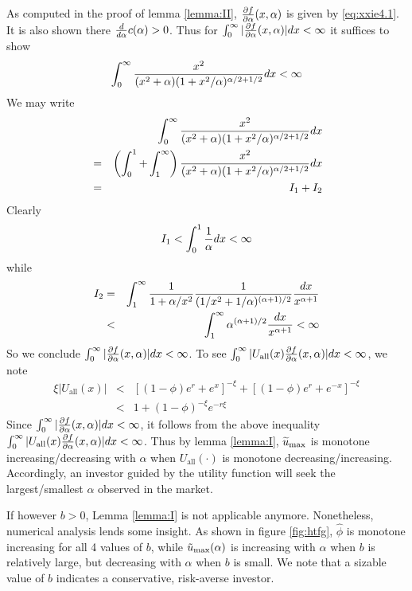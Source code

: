 \documentclass[11pt,a4]{amsart}
\newcommand{\pd}{\partial}
\newcommand{\wt}{\widetilde}
\newcommand{\1}{{\mathbf 1}}
\begin{document}
As computed in the proof of lemma \ref{lemma:II}, ${\pd f \over \pd
  \alpha}(x, \alpha)$ is given by \eqref{eq:xxie4.1}. It is also shown
there ${d \over d \alpha} c(\alpha) > 0$. Thus for
$\int_0^\infty |{\pd f \over \pd \alpha}(x, \alpha)| dx < \infty$
it suffices to show
\[
\int_ 0^\infty {
x^2
\over
(x^2 + \alpha) (1 + x^2 / \alpha)^{\alpha/2 + 1/2}
} dx < \infty
\]
We may write
\begin{eqnarray*}
&& \int_ 0^\infty {
x^2
\over
(x^2 + \alpha) (1 + x^2 / \alpha)^{\alpha/2 + 1/2}
} dx \\
&=& \left(\int_0^1 + \int_1^\infty \right) {
x^2
\over
(x^2 + \alpha) (1 + x^2 / \alpha)^{\alpha/2 + 1/2}
} dx \\
&=& I_1 + I_2
\end{eqnarray*}
Clearly
\[
I_1 < \int_0^1 {1 \over \alpha} dx < \infty
\]
while
\begin{eqnarray*}
  I_2 &=& \int_1^\infty {1 \over 1 + \alpha/x^2}
  {1 \over (1/x^2 + 1/\alpha)^{(\alpha+1) / 2}} {dx \over x^{\alpha +
      1}} \\
  &<& \int_1^\infty \alpha^{(\alpha+1) / 2} {dx \over x^{\alpha + 1}}
  < \infty
\end{eqnarray*}
So we conclude
$\int_0^\infty |{\pd f \over \pd \alpha}(x, \alpha)| dx < \infty$.
To see
$\int_0^\infty |U_{\text{all}}(x){\pd f \over \pd \alpha}(x, \alpha)| dx < \infty$, we note
\begin{eqnarray*}
  \xi |U_{\text{all}}(x)|
  &<& [(1 - \phi) e^r + e^x]^{-\xi} + [(1 - \phi) e^r + e^{-x}]^{-\xi} \\
  &<& 1 + (1 - \phi)^{-\xi} e^{-r \xi}
\end{eqnarray*}
Since $\int_0^\infty |{\pd f \over \pd \alpha}(x, \alpha)| dx < \infty$,
it follows from the above inequality $\int_0^\infty |U_{\text{all}}(x){\pd f \over \pd \alpha}(x, \alpha)| dx < \infty$.
Thus by lemma \ref{lemma:I}, $\wt u_{\rm max}$ is monotone
increasing/decreasing with $\alpha$ when $U_{\text{all}}(\cdot)$ is
monotone decreasing/increasing. Accordingly, an investor guided by the
utility function will seek the largest/smallest $\alpha$ observed in
the market.

If however $b > 0$, Lemma \ref{lemma:I} is not applicable
anymore. Nonetheless, numerical analysis lends some insight.
As shown in figure \ref{fig:htfg}, $\hat\phi$ is monotone increasing
for all 4 values of $b$, while $\tilde u_{\rm max}(\alpha)$ is
increasing with $\alpha$ when $b$ is relatively large, but
decreasing with $\alpha$ when $b$ is small. We note that a sizable
value of $b$ indicates a conservative, risk-averse investor.
\end{document}
